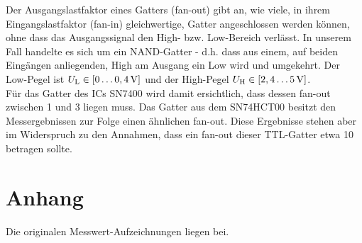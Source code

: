\documentclass[numbers=noenddot,12pt,a4paper]{scrartcl}
\newcommand{\ix}[1]{_\text{#1}}
\begin{document}
Der Ausgangslastfaktor eines Gatters (fan-out) gibt an, wie viele, in ihrem Eingangslastfaktor (fan-in) gleichwertige, Gatter angeschlossen werden können, ohne dass das Ausgangssignal den High- bzw. Low-Bereich verlässt. In unserem Fall handelte es sich um ein NAND-Gatter - d.h. dass aus einem, auf beiden Eingängen anliegenden, High am Ausgang ein Low wird und umgekehrt. Der Low-Pegel ist $U\ix{L}\in \left[0\dots  \unit[0,4]{V}\right]$ und der High-Pegel $U\ix{H}\in \left[2,4\dots \unit[5]{V}\right]$. \\
Für das Gatter des ICs SN7400 wird damit ersichtlich, dass dessen fan-out zwischen 1 und 3 liegen muss. Das Gatter aus dem SN74HCT00 besitzt den Messergebnissen zur Folge einen ähnlichen fan-out. Diese Ergebnisse stehen aber im Widerspruch zu den Annahmen, dass ein fan-out dieser TTL-Gatter etwa 10 betragen sollte. 
\section{Anhang}
Die originalen Messwert-Aufzeichnungen liegen bei.
\end{document}
